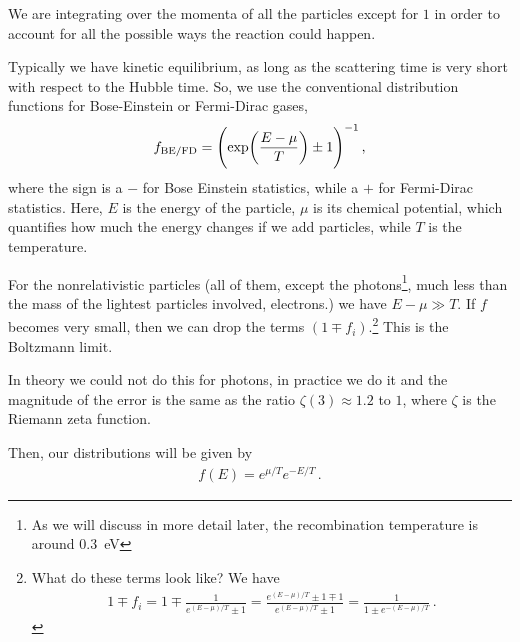 \documentclass[main.tex]{subfiles}
\begin{document}
We are integrating over the momenta of all the particles except for \(1\) in order to account for all the possible ways the reaction could happen. 


Typically we have kinetic equilibrium, as long as the scattering time is very short with respect to the Hubble time. 
So, we use the conventional distribution functions for Bose-Einstein or Fermi-Dirac gases,
%
\begin{align}
f_{\text{BE/FD}} = \qty(\exp(\frac{E- \mu }{T}) \pm 1)^{-1}
\,,
\end{align}
%
where the sign is a \(-\) for Bose Einstein statistics, while a \(+\) for Fermi-Dirac statistics. 
Here, \(E\) is the energy of the particle, \(\mu \) is its chemical potential, which quantifies how much the energy changes if we add particles, while \(T\) is the temperature. 

For the nonrelativistic particles (all of them, except the photons\footnote{As we will discuss in more detail later, the recombination temperature is around \SI{.3}{eV}}, much less than the mass of the lightest particles involved, electrons.) we have \(E - \mu \gg T\). 
If \(f\) becomes very small, then we can drop the terms \((1 \mp f_i)\).\footnote{What do these terms look like? We have 
%
\begin{align}
1 \mp f_i = 1 \mp \frac{1}{e^{(E-\mu ) / T} \pm 1}
= \frac{e^{(E - \mu ) / T} \pm 1 \mp 1}{e^{(E- \mu ) / T} \pm 1 }
= \frac{1}{1 \pm e^{- (E - \mu ) / T}}
\,.
\end{align}
%
} This is the Boltzmann limit. 

In theory we could not do this for photons, in practice we do it and the magnitude of the error is the same as the ratio \(\zeta (3) \approx 1.2\) to \(1\), where \(\zeta \) is the Riemann zeta function. 

Then, our distributions will be given by 
%
\begin{align}
f(E) = e^{ \mu / T} e^{- E/ T}
\,.
\end{align}
\end{document}
